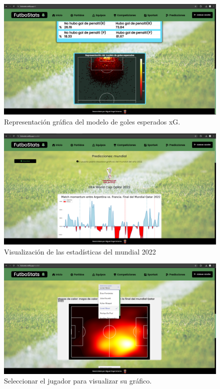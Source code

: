 \begin{figure}[H]
    \centering
    \includegraphics[width=1\linewidth]{img/golesEsperados2-UM.png}
    \caption{Representación gráfica del modelo de goles esperados xG.}
    \label{fig:enter-label}
\end{figure}

\begin{figure}[H]
    \centering
    \includegraphics[width=1\linewidth]{img/mundial1-UM.png}
    \caption{Visualización de las estadísticas del mundial 2022}
    \label{fig:enter-label}
\end{figure}

\begin{figure}[H]
    \centering
    \includegraphics[width=1\linewidth]{img/mundial2-UM.png}
    \caption{Seleccionar el jugador para visualizar su gráfico.}
    \label{fig:enter-label}
\end{figure}

